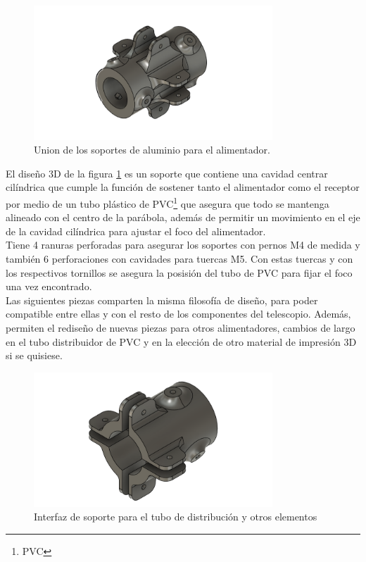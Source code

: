 \begin{figure}
    \centering
    \includegraphics[width=0.8\textwidth]{img/soporte3D5}
    \caption{Union de los soportes de aluminio para el alimentador.}
    \label{fig:ensamble4}
\end{figure}

El diseño 3D de la figura \ref{fig:ensamble4} es un soporte que contiene una cavidad centrar cilíndrica que cumple la función de sostener tanto el alimentador como el receptor por medio de un tubo plástico de PVC\footnote{PVC} que asegura que todo se mantenga alineado con el centro de la parábola, además de permitir un movimiento en el eje de la cavidad cilíndrica para ajustar el foco del alimentador.\\

Tiene 4 ranuras perforadas para asegurar los soportes con pernos M4 de medida y también 6 perforaciones con cavidades para tuercas M5. Con estas tuercas y con los respectivos tornillos se asegura la posisión del tubo de PVC para fijar el foco una vez encontrado.\\

Las siguientes piezas comparten la misma filosofía de diseño, para poder compatible entre ellas y con el resto de los componentes del telescopio. Además, permiten el rediseño de nuevas piezas para otros alimentadores, cambios de largo en el tubo distribuidor de PVC y en la elección de otro material de impresión 3D si se quisiese.\\

\begin{figure}
    \centering
    \includegraphics[width=0.8\textwidth]{img/soporte3D1v1}
    \caption{Interfaz de soporte para el tubo de distribución y otros elementos}
    \label{fig:ensamble5}
\end{figure}

